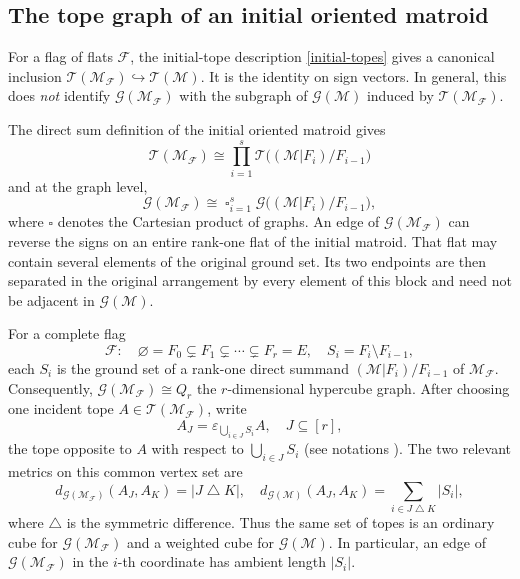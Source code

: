 \documentclass[10pt]{amsart}
\theoremstyle{plain}
\theoremstyle{definition}
\newcommand{\T}{\mathcal{T}}
\newcommand{\F}{\mathcal{F}}
\newcommand{\G}{\mathcal{G}}
\newcommand{\M}{\mathcal{M}}
\newcommand{\eps}{\varepsilon}
\begin{document}
\subsection{The tope graph of an initial oriented matroid}
\label{initial-tope-graph}

For a flag of flats $\F$, the initial-tope description \eqref{initial-topes} gives a canonical inclusion $\T(\M_{\F})\hookrightarrow\T(\M)$. It is the identity on sign vectors. In general, this does \emph{not} identify $\G(\M_{\F})$ with the subgraph of $\G(\M)$ induced by $\T(\M_{\F})$.

The direct sum definition of the initial oriented matroid gives
\[
\T(\M_{\F})\cong\prod_{i=1}^s\T\bigl((\M|F_i)/F_{i-1}\bigr)
\]
and at the graph level,
\[
\G(\M_{\F})\cong\mathop{\square}_{i=1}^s\G\bigl((\M|F_i)/F_{i-1}\bigr),
\]
where $\square$ denotes the Cartesian product of graphs. An edge of $\G(\M_{\F})$ can reverse the signs on an entire rank-one flat of the initial matroid. That flat may contain several elements of the original ground set. Its two endpoints are then separated in the original arrangement by every element of this block and need not be adjacent in $\G(\M)$.

For a complete flag
\[
\F:\quad \varnothing=F_0\subsetneq F_1\subsetneq\cdots\subsetneq F_r=E,\quad S_i=F_i\setminus F_{i-1},
\]
each $S_i$ is the ground set of a rank-one direct summand $(\M|F_i)/F_{i-1}$ of $\M_{\F}$. Consequently, $\G(\M_{\F})\cong Q_r$ the $r$-dimensional hypercube graph. After choosing one incident tope $A\in\T(\M_\F)$, write
\[
A_J=\eps_{\bigcup_{i\in J}S_i}A,\quad J\subseteq[r],
\]
the tope opposite to $A$ with respect to $\bigcup_{i\in J}S_i$ (see notations ). The two relevant metrics on this common vertex set are
\[
d_{\G(\M_{\F})}(A_J,A_K)=|J\mathbin{\triangle}K|,\quad d_{\G(\M)}(A_J,A_K)=\sum_{i\in J\mathbin{\triangle}K}|S_i|,
\]
where $\mathbin{\triangle}$ is the symmetric difference. Thus the same set of topes is an ordinary cube for $\G(\M_\F)$ and a weighted cube for $\G(\M)$. In particular, an edge of $\G(\M_\F)$ in the $i$-th coordinate has ambient length $|S_i|$.
\end{document}
